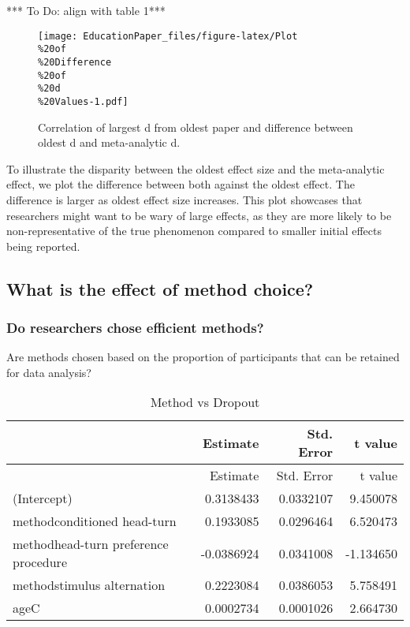 \documentclass[english,floatsintext,man]{apa6}
\begin{document}
*** To Do: align with table 1***

\begin{figure}[htbp]
\centering
\texttt{[image: EducationPaper\_files/figure-latex/Plot\\\%20of\\\%20Difference\\\%20of\\\%20d\\\%20Values-1.pdf]}
\caption{Correlation of largest d from oldest paper and difference
between oldest d and meta-analytic d.}
\end{figure}

To illustrate the disparity between the oldest effect size and the
meta-analytic effect, we plot the difference between both against the
oldest effect. The difference is larger as oldest effect size increases.
This plot showcases that researchers might want to be wary of large
effects, as they are more likely to be non-representative of the true
phenomenon compared to smaller initial effects being reported.

\subsection{What is the effect of method
choice?}\label{what-is-the-effect-of-method-choice}

\subsubsection{Do researchers chose efficient
methods?}\label{do-researchers-chose-efficient-methods}

Are methods chosen based on the proportion of participants that can be
retained for data analysis?

\begin{longtable}[]{@{}lrrr@{}}
\caption{Method vs Dropout}\tabularnewline
\toprule
& Estimate & Std. Error & t value\tabularnewline
\midrule
\endfirsthead
\toprule
& Estimate & Std. Error & t value\tabularnewline
\midrule
\endhead
(Intercept) & 0.3138433 & 0.0332107 & 9.450078\tabularnewline
methodconditioned head-turn & 0.1933085 & 0.0296464 &
6.520473\tabularnewline
methodhead-turn preference procedure & -0.0386924 & 0.0341008 &
-1.134650\tabularnewline
methodstimulus alternation & 0.2223084 & 0.0386053 &
5.758491\tabularnewline
ageC & 0.0002734 & 0.0001026 & 2.664730\tabularnewline
\bottomrule
\end{longtable}
\end{document}
